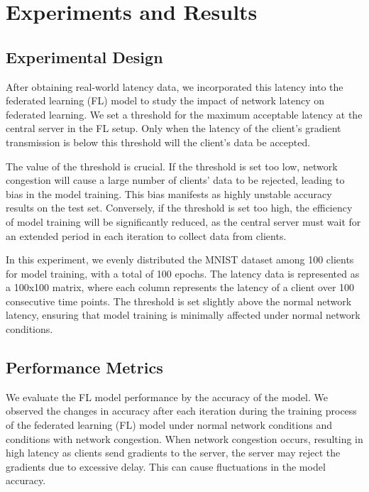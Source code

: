 \documentclass[conference]{IEEEtran}
\begin{document}


\section{Experiments and Results}

\subsection{Experimental Design}

After obtaining real-world latency data, we incorporated this latency into the federated learning (FL) model to study the impact of network latency on federated learning. We set a threshold for the maximum acceptable latency at the central server in the FL setup. Only when the latency of the client's gradient transmission is below this threshold will the client's data be accepted.

The value of the threshold is crucial. If the threshold is set too low, network congestion will cause a large number of clients' data to be rejected, leading to bias in the model training. This bias manifests as highly unstable accuracy results on the test set. Conversely, if the threshold is set too high, the efficiency of model training will be significantly reduced, as the central server must wait for an extended period in each iteration to collect data from clients.

In this experiment, we evenly distributed the MNIST dataset among 100 clients for model training, with a total of 100 epochs. The latency data is represented as a 100x100 matrix, where each column represents the latency of a client over 100 consecutive time points. The threshold is set slightly above the normal network latency, ensuring that model training is minimally affected under normal network conditions.

\subsection{Performance Metrics}

We evaluate the FL model performance by the accuracy of the model. We observed the changes in accuracy after each iteration during the training process of the federated learning (FL) model under normal network conditions and conditions with network congestion. When network congestion occurs, resulting in high latency as clients send gradients to the server, the server may reject the gradients due to excessive delay. This can cause fluctuations in the model accuracy.
\end{document}
